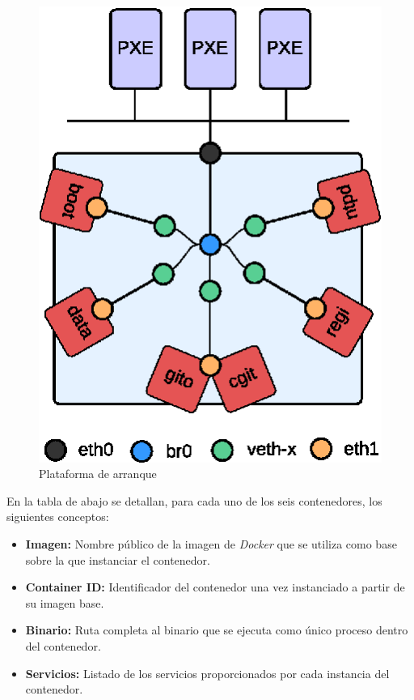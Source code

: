 \documentclass[a4paper,12pt,spanish,final]{epsc_tfc_pfc}
\begin{document}
\begin{figure}
\vspace{-15pt}
\begin{center}
  \includegraphics[scale=1]{booddies2}
  \caption{Plataforma de arranque}
\end{center}
\vspace{-110pt}
\end{figure}

En la tabla de abajo se detallan, para cada uno de los seis contenedores, los siguientes conceptos:

\begin{itemize}[leftmargin=20pt]
  \item \textbf{Imagen:} Nombre público de la imagen de \emph{Docker} que se utiliza como base sobre la que instanciar el contenedor.
  \item \textbf{Container ID:} Identificador del contenedor una vez instanciado a partir de su imagen base.
  \item \textbf{Binario:} Ruta completa al binario que se ejecuta como único proceso dentro del contenedor.
  \item \textbf{Servicios:} Listado de los servicios proporcionados por cada instancia del contenedor.
\end{itemize}
\end{document}
